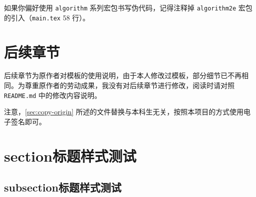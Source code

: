 如果你偏好使用 \texttt{algorithm} 系列宏包书写伪代码，记得注释掉 \texttt{algorithm2e} 宏包的引入（\texttt{main.tex} 58 行）。

\section{后续章节}

后续章节为原作者对模板的使用说明，由于本人修改过模板，部分细节已不再相同。为尊重原作者的劳动成果，我没有对后续章节进行修改，阅读时请对照 \texttt{README.md} 中的修改内容说明。

注意，\ref{sec:copy-origin} 所述的文件替换与本科生无关，按照本项目的方式使用电子签名即可。

\section{section标题样式测试}
\subsection{subsection标题样式测试}